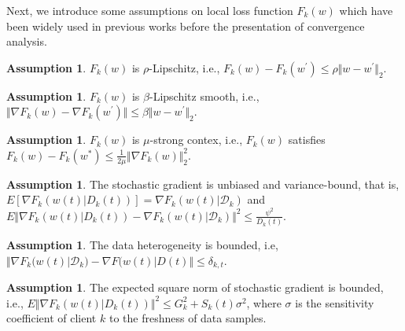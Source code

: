 \documentclass{article}
\theoremstyle{plain}
\theoremstyle{definition}
\newtheorem{assumption}[theorem]{Assumption}
\theoremstyle{remark}
\begin{document}
Next, we introduce some assumptions on local loss function $F_k(w)$ which have been widely used in previous works before the presentation of convergence analysis.
\begin{assumption}
  \label{assumption:1}
  $F_k(w)$ is $\rho$-Lipschitz, i.e., $F_k(w) - F_k(w^{'}) \leq \rho \Vert w - w^{'} \Vert_2$.
\end{assumption}
\begin{assumption}
  \label{assumption:2}
  $F_k(w)$ is $\beta$-Lipschitz smooth, i.e., $\Vert\nabla F_k(w) - \nabla F_k(w^{'})\Vert \leq \beta \Vert w-w^{'} \Vert_2$.
\end{assumption}
\begin{assumption}
  \label{assumption:3}
  $F_k(w)$ is $\mu$-strong contex, i.e., $F_k(w)$ satisfies $F_k(w) - F_k(w^*) \leq \frac{1}{2\mu}\Vert\nabla F_k(w)\Vert_2^2$.
\end{assumption}
\begin{assumption}
  \label{assumption:4}
  The stochastic gradient is unbiased and variance-bound, that is, $E[\nabla F_k(w(t)|D_k(t))] = \nabla F_k(w(t)|\mathcal{D}_k)$ and $E\Vert\nabla F_k(w(t)|D_k(t)) - \nabla F_k(w(t)|\mathcal{D}_k)\Vert^2 \leq \frac{\psi^2}{D_k(t)}$. 
\end{assumption}
\begin{assumption}
  \label{assumption:5}
  The data heterogeneity is bounded, i.e, $\Vert \nabla F_k(w(t)|\mathcal{D}_k) - \nabla F(w(t)|D(t)\Vert \leq \delta_{k,t}$. 
\end{assumption}
\begin{assumption}
  \label{assumption:6}
  The expected square norm of stochastic gradient is bounded, i.e., $E\Vert \nabla F_k(w(t)|D_k(t))\Vert^2 \leq G_k^2 + S_k(t)\sigma^2$, where $\sigma$ is the sensitivity coefficient of client $k$ to the freshness of data samples.
\end{assumption}
\end{document}
